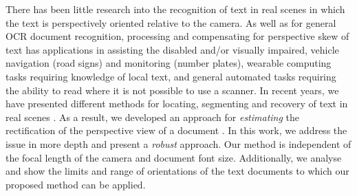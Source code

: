 \documentclass{elsart}   %
\begin{document}
There has been little research into the recognition of text in real scenes in
which the text is perspectively oriented relative to the camera.  As well as for
general OCR document recognition, processing and compensating for perspective
skew of text has applications in assisting the disabled and/or visually
impaired, vehicle navigation (road signs) and monitoring (number plates), wearable
computing tasks requiring knowledge of local text, and general automated tasks
requiring the ability to read where it is not possible to use a scanner. In
recent years, we have presented different methods for locating, segmenting and
recovery of text in real scenes
\cite{joey1,ClarkICPR2000,2001-clark,justin,clark-ijdar-2001}. As a result, we
developed an approach for {\em estimating} the rectification of the perspective
view of a document \cite{2001-clark,clark-ijdar-2001}. In this work, we address
the issue in more depth and present a {\em robust} approach. 
Our method is independent of the focal length of
the camera and document font size. Additionally, we analyse and show the limits
and range of orientations of the text documents to which our proposed method can
be applied.


\end{document}
